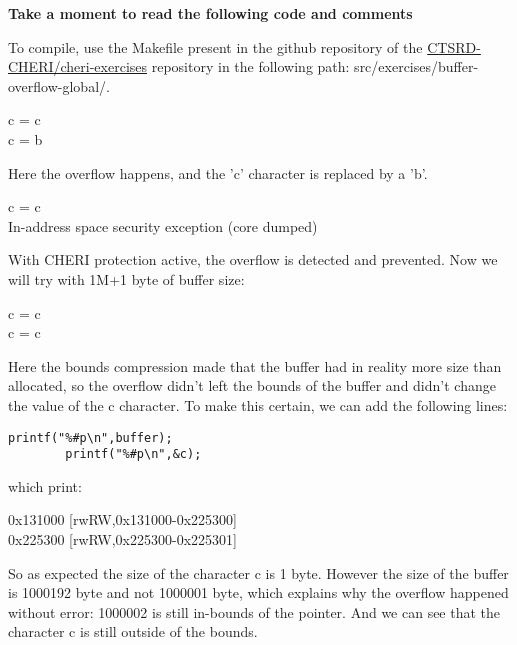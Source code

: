 \documentclass[a4paper, 11pt]{article}
\begin{document}
	\textbf{Take a moment to read the following code and comments}
	



	To compile, use the Makefile present in the github repository of the \href{https://github.com/CTSRD-CHERI/cheri-exercises}{CTSRD-CHERI/cheri-exercises} repository in the following path: src/exercises/buffer-overflow-global/. 
	
	\begin{tcolorbox}[colback=gray!5!white, colframe=gray!75!black, title=Output on a classic \Gls{risc-v} environment (no CHERI Protection)]
	c = c\\
	c = b
	\end{tcolorbox}
	Here the overflow happens, and the 'c' character is replaced by a 'b'.\break

	\begin{tcolorbox}[colback=gray!5!white, colframe=blue!75!black, title=Output On an environment protected by CHERI]
		c = c\\
		In-address space security exception (core dumped)
	\end{tcolorbox}
	With CHERI protection active, the overflow is detected and prevented.
	Now we will try with 1M+1 byte of buffer size:
	\begin{tcolorbox}[colback=gray!5!white, colframe=blue!75!black, title=Output On an environment protected by CHERI]
		c = c\\
		c = c
	\end{tcolorbox}
	Here the bounds compression made that the buffer had in reality more size than allocated, so the overflow didn't left the bounds of the buffer and didn't change the value of the c character.
	To make this certain, we can add the following lines:

	\begin{lstlisting}[caption=Example C Code]
	printf("%#p\n",buffer);
        printf("%#p\n",&c);
	\end{lstlisting}
	which print:
	\begin{tcolorbox}[colback=gray!5!white, colframe=blue!75!black, title=Output On an environment protected by CHERI]
	0x131000 [rwRW,0x131000-0x225300]\\
	0x225300 [rwRW,0x225300-0x225301]
	\end{tcolorbox}
	So as expected the size of the character c is 1 byte. However the size of the buffer is 1000192 byte and not 1000001 byte, which explains why the  overflow happened without error: 1000002 is still in-bounds of the pointer. And we can see that the character c is still outside of the bounds.
	
\end{document}
